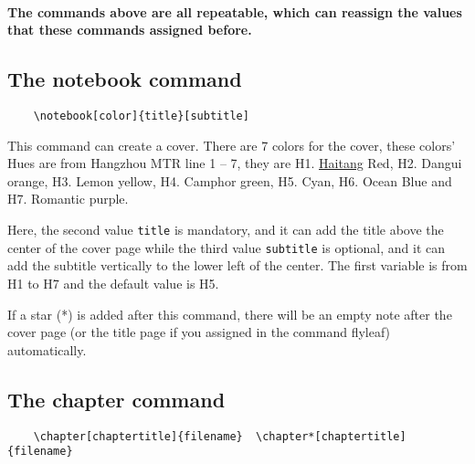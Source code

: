 \documentclass[11pt]{article}
\def\cmd#1{\texorpdfstring{\textcolor{cmdcolor}{\textsf{#1}}}{“#1”}}
\begin{document}
\paragraph{The commands above are all repeatable, which can reassign the values that these commands assigned before.}

\subsection{The \cmd{notebook} command}

\begin{verbatim}
    \notebook[color]{title}[subtitle]
\end{verbatim}

This command can create a cover. There are 7 colors for the cover, these colors' Hues are from Hangzhou MTR line 1 -- 7, they are \textcolor{H1}{H1. \textsf{\href{https://en.wikipedia.org/wiki/Malus_spectabilis}{Haitang} Red}}, \textcolor{H2}{H2. \textsf{Dangui orange}}, \textcolor{H3}{H3. \textsf{Lemon yellow}}, \textcolor{H4}{H4. \textsf{Camphor green}}, \textcolor{H5}{H5. \textsf{Cyan}}, \textcolor{H6}{H6.\textsf{ Ocean Blue}} and \textcolor{H7}{H7. \textsf{Romantic purple}}.

Here, the second value \verb|title| is mandatory, and it can add the title above the center of the cover page while the third value \verb|subtitle| is optional, and it can add the subtitle vertically to the lower left of the center. The first variable is from \textcolor{H1}{H1} to \textcolor{H7}{H7} and the default value is \textcolor{H5}{H5}.

If a star (*) is added after this command, there will be an empty note after the cover page (or the title page if you assigned in the command \cmd{flyleaf}) automatically.

\subsection{The \cmd{chapter} command}
\begin{verbatim}
    \chapter[chaptertitle]{filename}  \chapter*[chaptertitle]{filename}
\end{verbatim}
\end{document}
